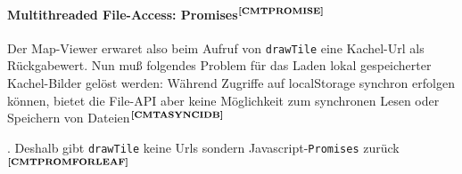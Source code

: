 \paragraph{Multithreaded File-Access: Promises$^{\textbf{\ref{CMTPROMISE}}}$}
\addtocounter{footnote}{1}%
Der Map-Viewer erwaret also beim Aufruf von \texttt{drawTile} eine Kachel-Url als Rückgabewert. Nun muß folgendes Problem für das Laden lokal gespeicherter Kachel-Bilder gelöst werden: Während Zugriffe auf localStorage synchron erfolgen können, bietet die File-API aber keine Möglichkeit zum synchronen Lesen oder Speichern von Dateien$^{\textbf{\ref{CMTASYNCIDB}}}$%
\addtocounter{footnote}{1}%
. Deshalb gibt \texttt{drawTile} keine Urls sondern Javascript-\texttt{Promises} zurück$^{\textbf{\ref{CMTPROMFORLEAF}}}$%
\addtocounter{footnote}{1}%
